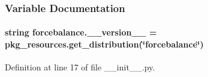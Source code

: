 \subsubsection{Variable Documentation}
\hypertarget{namespaceforcebalance_a6c10581ea309550b5703fbe56f62e8a2}{
\paragraph[{\-\_\-\-\_\-version\-\_\-\-\_\-}]{\setlength{\rightskip}{0pt plus 5cm}string forcebalance.\-\_\-\-\_\-version\-\_\-\-\_\- = pkg\-\_\-resources.\-get\-\_\-distribution(\char`\"{}forcebalance\char`\"{})}}\label{namespaceforcebalance_a6c10581ea309550b5703fbe56f62e8a2}


Definition at line 17 of file \-\_\-\-\_\-init\-\_\-\-\_\-.\-py.


